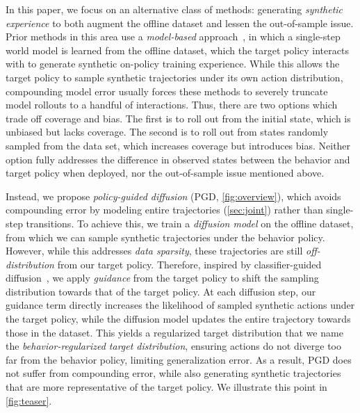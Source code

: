 \documentclass[10pt]{article} %
\theoremstyle{plain}
\theoremstyle{definition}
\theoremstyle{remark}
\begin{document}
In this paper, we focus on an alternative class of methods: generating \textit{synthetic experience} to both augment the offline dataset and lessen the out-of-sample issue.
Prior methods in this area use a \textit{model-based} approach~\citep[see \autoref{sec:autoregressive}]{mopo, kidambi2020morel, augwm}, in which a single-step world model is learned from the offline dataset, which the target policy interacts with to generate synthetic on-policy training experience.
While this allows the target policy to sample synthetic trajectories under its own action distribution, compounding model error usually forces these methods to severely truncate model rollouts to a handful of interactions.
Thus, there are two options which trade off coverage and bias.
The first is to roll out from the initial state, which is unbiased but lacks coverage. 
The second is to roll out from states randomly sampled from the data set, which increases coverage but introduces bias.
Neither option fully addresses the difference in observed states between the behavior and target policy when deployed, nor the out-of-sample issue mentioned above.


Instead, we propose \textit{policy-guided diffusion} (PGD, \autoref{fig:overview}), which avoids compounding error by modeling entire trajectories (\autoref{sec:joint}) rather than single-step transitions.
To achieve this, we train a \textit{diffusion model} on the offline dataset, from which we can sample synthetic trajectories under the behavior policy.
However, while this addresses \textit{data sparsity}, these trajectories are still \textit{off-distribution} from our target policy.
Therefore, inspired by classifier-guided diffusion~\citep{dhariwal2021diffusion}, we apply \textit{guidance} from the target policy to shift the sampling distribution towards that of the target policy.
At each diffusion step, our guidance term directly increases the likelihood of sampled synthetic actions under the target policy, while the diffusion model updates the entire trajectory towards those in the dataset.
This yields a regularized target distribution that we name the \emph{behavior-regularized target distribution}, ensuring actions do not diverge too far from the behavior policy, limiting generalization error.
As a result, PGD does not suffer from compounding error, while also generating synthetic trajectories that are more representative of the target policy.
We illustrate this point in \autoref{fig:teaser}.
\end{document}
